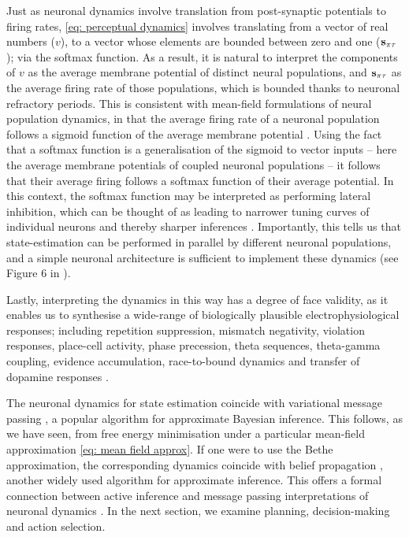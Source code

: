 \documentclass[review,12pt,authoryear]{elsarticle}
\begin{document}
Just as neuronal dynamics involve translation from post-synaptic potentials to firing rates, \eqref{eq: perceptual dynamics} involves translating from a vector of real numbers ($v$), to a vector whose elements are bounded between zero and one ($\bold s_{\pi\tau}$); via the softmax function. As a result, it is natural to interpret the components of $v$ as the average membrane potential of distinct neural populations, and $\bold s_{\pi\tau}$ as the average firing rate of those populations, which is bounded thanks to neuronal refractory periods. This is consistent with mean-field formulations of neural population dynamics, in that the average firing rate of a neuronal population follows a sigmoid function of the average membrane potential \citep{marreirosPopulationDynamicsVariance2008,decoDynamicBrainSpiking2008,moranNeuralMassesFields2013}.
Using the fact that a softmax function is a generalisation of the sigmoid to vector inputs -- here the average membrane potentials of coupled neuronal populations -- it follows that their average firing follows a softmax function of their average potential. In this context, the softmax function may be interpreted as performing lateral inhibition, which can be thought of as leading to narrower tuning curves of individual neurons and thereby sharper inferences \citep{vonbekesySensoryInhibition1967}. Importantly, this tells us that state-estimation can be performed in parallel by different neuronal populations, and a simple neuronal architecture is sufficient to implement these dynamics (see Figure 6 in \citep{parrNeuronalMessagePassing2019}).

Lastly, interpreting the dynamics in this way has a degree of face validity, as it enables us to synthesise a wide-range of biologically plausible electrophysiological responses; including repetition suppression, mismatch negativity, violation responses, place-cell activity, phase precession, theta sequences, theta-gamma coupling, evidence accumulation, race-to-bound dynamics and transfer of dopamine responses \citep{schwartenbeckDopaminergicMidbrainEncodes2015,fristonActiveInferenceProcess2017}.

The neuronal dynamics for state estimation coincide with variational message passing \citep{winnVariationalMessagePassing2005,dauwelsVariationalMessagePassing2007}, a popular algorithm for approximate Bayesian inference. This follows, as we have seen, from free energy minimisation under a particular mean-field approximation \eqref{eq: mean field approx}. If one were to use the Bethe approximation, the corresponding dynamics coincide with belief propagation \citep{bishopPatternRecognitionMachine2006,loeligerIntroductionFactorGraphs2004,parrNeuronalMessagePassing2019,schwobelActiveInferenceBelief2018,yedidiaConstructingFreeEnergyApproximations2005}, another widely used algorithm for approximate inference. This offers a formal connection between active inference and message passing interpretations of neuronal dynamics \citep{fristonGraphicalBrainBelief2017,dauwelsMeasuringNeuralSynchrony2007,georgeBeliefPropagationWiring2005}. In the next section, we examine planning, decision-making and action selection.
\end{document}
